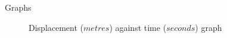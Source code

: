 \documentclass[final]{beamer}
\newlength{\sepwid}
\newlength{\onecolwid}
\newlength{\twocolwid}
\begin{document}
\begin{frame}
\begin{columns}[t]
\begin{column}{\twocolwid}
\begin{columns}[t,totalwidth=\twocolwid]
\begin{column}{\onecolwid}
\begin{exampleblock}{Graphs}
\begin{figure}
    \caption{Displacement ($metres$) against time ($seconds$) graph}
    \label{fig:displacement}
\end{figure}
\end{exampleblock}




\end{column} %

\end{columns} %




\begin{columns}[t,totalwidth=\twocolwid] %

\begin{column}{\onecolwid} %






\end{column} %
\begin{column}{\sepwid}\end{column} %

\begin{column}{\onecolwid} %



\end{column} %

\end{columns} %

\end{column} %

\begin{column}{\sepwid}\end{column} %


\end{columns}
\end{frame}
\end{document}
